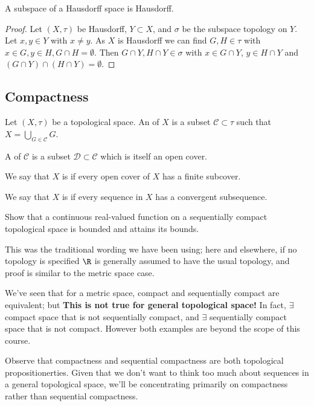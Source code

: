 \begin{proposition} \label{prp:32}
A subspace of a Hausdorff space is Hausdorff.
\end{proposition}

\begin{proof}
Let $(X,\tau)$ be Hausdorff, $Y\subset X$, and $\sigma$ be the subspace topology on $Y$. Let $x,y\in Y$ with $x\neq y$. As $X$ is Hausdorff we can find $G,H\in \tau$ with $x\in G, y\in H, G\cap H = \emptyset$. Then $G\cap Y, H\cap Y \in \sigma$ with $x\in G\cap Y$, $y\in H\cap Y$ and $(G\cap Y)\cap (H\cap Y) = \emptyset$.
\end{proof}

\subsection{Compactness}
\begin{definition}
    Let $(X,\tau)$ be a topological space. An  of $X$ is a subset $\mathcal{C}\subset \tau$ such that $X = \bigcup_{G\in\mathcal{C}} G$.
\end{definition}

\begin{definition}[Subcover]
    A  of $\mathcal{C}$ is a subset $\mathcal{D}\subset \mathcal{C}$ which is itself an open cover.
\end{definition} 

\begin{definition}[Compactness]
    We say that $X$ is  if every open cover of $X$ has a finite subcover.
\end{definition}

\begin{definition}
    We say that $X$ is  if every sequence in $X$ has a convergent subsequence.
\end{definition} 

\begin{exercise}
Show that a continuous real-valued function on a sequentially compact topological space is bounded and attains its bounds.
\end{exercise}

\begin{remark}
This was the traditional wording we have been using; here and elsewhere, if no topology is specified $\R$ is generally assumed to have the usual topology, and proof is similar to the metric space case.

We've seen that for a metric space, compact and sequentially compact are equivalent; but \textbf{\color{red} This is not true for general topological space!} In fact, $\exists$ compact space that is not sequentially compact, and $\exists$ sequentially compact space that is not compact. However both examples are beyond the scope of this course.

Observe that compactness and sequential compactness are both topological propositionerties. Given that we don't want to think too much about sequences in a general topological space, we'll be concentrating primarily on compactness rather than sequential compactness.
\end{remark}

